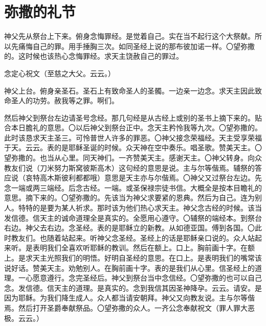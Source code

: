 \documentclass[UTF8,17pt]{ctexart}
\begin{document}

\section{弥撒的礼节}

神⽗先从祭台上下来。俯⾝念悔罪经。是觉着⾃⼰。实在当不起⾏这个⼤祭献。所以先痛悔⾃⼰的罪。⽤⼿捶胸三次。如同圣经上说的那布彼加诺⼀样。〇望弥撒的。这时候也该热⼼念悔罪经。求天主饶赦⾃⼰的罪过。

念定⼼祝⽂（⾄慈之⼤⽗。云云。）

神⽗上台。俯⾝亲圣⽯。圣⽯上有致命圣⼈的圣髑。⼀边亲⼀边念。求天主因此致命圣⼈的功劳。赦我等之罪。啊们。

然后神⽗到祭台左边请圣号念经。那⼏句经是从古经上或别的圣书上摘下来的。贴合本⽇膽礼的意思。〇以后神⽗到祭台正中。念天主矜怜我等九次。〇望弥撒的。此时该恳求天主圣三。可怜普世⼈许多的罪恶。〇神⽗接念荣福经。天主受享荣福于天。云云。表的是耶稣圣诞的时候。众天神在空中奏乐。唱圣歌。赞美天主。〇望弥撒的。也当从⼼⾥。同天神们。⼀齐赞美天主。感谢天主。〇神⽗转⾝。向众教友们说（⼑⽶努⼒斯窝彼斯⾼⽊）这句经的意思是说。主与尔等偕焉。辅祭的答应说（哀特⾼⽊斯彼利都都哦）意思是天主亦与尔偕焉。〇神⽗又过祭台左边。先念⼀端或两三端经。后念古经。⼀端。或圣保禄宗徒书信。⼤概全是按本⽬瞻礼的意思。摘下来的。〇望弥撒的。先该当为神⽗求要紧的恩典。然后为⾃⼰。连为别⼈。特特的是要为某⼈祈求。那时该为他们热⼼求天主。神⽗念古经的时候。该当发信德。信天主的诚命道理全是真实的。全愿⽤⼼遵守。〇辅祭的端经本。到祭台右边。神⽗去右边。念圣经。表的是耶稣⽴的新教。从如德亚国。傅到各国。〇此时教友们。也随着站起来。听神父念圣经。圣经上的话是耶稣亲口说的。众人站起来听。是表明我们全喜欢听耶稣的教训。然后在额上。口上。胸前画十字。在额上。是求天主光照我们的明悟。好明自圣经的意思。在口上。是表明我们的嘴常该说好话。赞美天主。劝勉别人。在胸前画十字。表的是我们从心⾥。信圣经上的道理。⼀⼼愿意遵⾏。念完圣经后。神⽗到祭台当中念信经。〇望弥撒的也可以⾃⼰念。发信德。信天主的道理。是真实的。念到我信其因圣神降孕。云云。请安。是因为耶稣。为我们降⽣成⼈。众⼈都当请安朝拜。神⽗又向教友说。主与尔等偕焉。然后打开圣爵奉献祭品。〇望弥撒的众⼈。⼀齐公念奉献祝⽂（罪⼈罪⼤恶极。云云。）
\end{document}
